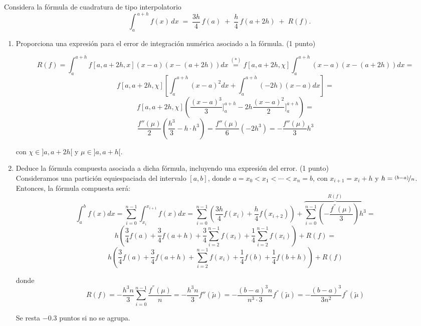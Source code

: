 \documentclass[12pt]{article}
\begin{document}
    \begin{ejercicio}[3 puntos]
      Considera la fórmula de cuadratura de tipo interpolatorio
      \[
      \int_{a}^{\,a+h} f(x)\,dx \;=\; \frac{3h}{4}\,f(a)\;+\;\frac{h}{4}\,f(a+2h)\;+\;R(f).
      \]
      \begin{enumerate}
        \item Proporciona una expresión para el error de integración numérica asociado a la fórmula. (1 punto)
        
        $$R(f) = \int_a^{a+h} f[a, a+2h, x] (x-a) (x-(a+2h)) dx \stackrel{(*)}{=} f[a,a+2h, \chi] \int_{a}^{a+h} (x-a)(x-(a+2h)) dx = $$
        $$f[a,a+2h, \chi] \left[ \int_a^{a+h} (x-a)^2 dx + \int_a^{a+h} (-2h)(x-a) dx \right] = $$
        $$f[a,a+2h,\chi] \left( \dfrac{(x-a)^3}{3} \bigg]_a^{a+h} - 2h \dfrac{(x-a)^2}{2} \bigg]_a^{a+h}  \right) = $$
        $$\dfrac{f''(\mu)}{2} \left( \dfrac{h^3}{3} - h \cdot h^3 \right) = \dfrac{f''(\mu)}{6} (-2h^3) = - \dfrac{f''(\mu)}{3} h^3$$

        con $\chi \in ]a, a+2h[$ y $\mu \in ]a, a+h[$.

        \item Deduce la fórmula compuesta asociada a dicha fórmula, incluyendo una expresión del error. (1 punto) \\
        
        Consideramos una partición equiespaciada del intervalo $[a,b]$, donde $a = x_0 < x_1 < \cdots < x_n = b$, con $x_{i+1} = x_i + h$ y $h = \nicefrac{(b-a)}{n}$. Entonces, la fórmula compuesta será:
        $$\int_a^b f(x) dx = \sum_{i=0}^{n-1} \int_{x_i}^{x_{i+1}} f(x) dx = \sum_{i=0}^{n-1} \left( \dfrac{3h}{4} f(x_i) + \dfrac{h}{4} f(x_{i+2}) \right) + \overbrace{\sum_{i=0}^{n-1} \left( - \dfrac{f^{''}(\mu)}{3} \right) h^3}^{R(f)} = $$
        $$h \left( \dfrac{3}{4} f(a) + \dfrac{3}{4} f(a+h) + \dfrac{3}{4} \sum_{i=2}^{n-1} f(x_i) + \dfrac{1}{4} \sum_{i=2}^{n-1} f(x_i) \right) + R(f) = $$
        $$h \left( \dfrac{3}{4} f(a) + \dfrac{3}{4} f(a+h) + \sum_{i=2}^{n-1} f(x_i) + \dfrac{1}{4} f(b) + \dfrac{1}{4} f(b+h) \right) + R(f)$$

        donde 
        $$R(f) = - \dfrac{h^3 n}{3} \sum_{i=0}^{n-1} \dfrac{f^{''}(\mu)}{n} = - \dfrac{h^3 n}{3} f''(\tilde{\mu}) = - \dfrac{(b-a)^3 n}{n^3 \cdot 3} f^{''}(\tilde{\mu}) = - \dfrac{(b-a)^3}{3n^2} f^{''}(\tilde{\mu})$$

        \begin{observacion}
          Se resta $-0.3$ puntos si no se agrupa.
        \end{observacion}


\end{enumerate}
\end{ejercicio}
\end{document}
